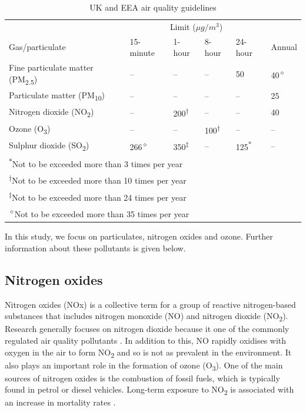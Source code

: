 \documentclass[11pt]{report}
\begin{document}
\begin{table}[!tbp]
  \centering
  \caption{UK and EEA air quality guidelines}
  \label{airqualityguidelines}
  \begin{tabular}{ l l l l l l }
  \toprule
  & \multicolumn{4}{c}{Limit ($\mu g/m^3$)} 													\\ \cmidrule(l{0mm}r{0mm}){2-6}
  Gas/particulate  							& 15-minute 	& 1-hour 	& 8-hour 	& 24-hour 	& Annual 	\\ \midrule
  Fine particulate matter (PM\textsubscript{2.5}) 	& -- 			& -- 		& -- 		& 50 		& 40\textsuperscript{$\diamond$} 		\\
  Particulate matter (PM\textsubscript{10}) 		& -- 			& -- 		& -- 		& -- 		& 25 		\\
  Nitrogen dioxide (NO\textsubscript{2}) 			& -- 			& 200\textsuperscript{$\dagger$} 	& -- 		& -- 		& 40 		\\
  Ozone (O\textsubscript{3}) 					& -- 			& -- 		& 100\textsuperscript{$\dagger$}	& --		& -- 		\\
  Sulphur dioxide (SO\textsubscript{2})			& 266\textsuperscript{$\diamond$}		& 350\textsuperscript{$\ddagger$}	& --		& 125\textsuperscript{*}	& -- 		\\ \bottomrule
  \multicolumn{6}{l}{\textsuperscript{$\ast$}\footnotesize{Not to be exceeded more than 3 times per year}} \\
  \multicolumn{6}{l}{\textsuperscript{$\dagger$}\footnotesize{Not to be exceeded more than 10 times per year}} \\
  \multicolumn{6}{l}{\textsuperscript{$\ddagger$}\footnotesize{Not to be exceeded more than 24 times per year}} \\
  \multicolumn{6}{l}{\textsuperscript{$\diamond$}\footnotesize{Not to be exceeded more than 35 times per year}} \\
  \end{tabular}
\end{table}


In this study, we focus on particulates, nitrogen oxides and ozone. Further information about these pollutants is given below.

\subsection{Nitrogen oxides}

Nitrogen oxides (NOx) is a collective term for a group of reactive nitrogen-based substances that includes nitrogen monoxide (NO) and nitrogen dioxide (NO\textsubscript{2}). Research generally focuses on nitrogen dioxide because it one of the commonly regulated air quality pollutants \citep{Brook2004cardiostmnt}. In addition to this, NO rapidly oxidises with oxygen in the air to form NO\textsubscript{2} and so is not as prevalent in the environment. It also plays an important role in the formation of ozone (O\textsubscript{3}). One of the main sources of nitrogen oxides is the combustion of fossil fuels, which is typically found in petrol or diesel vehicles. Long-term exposure to NO\textsubscript{2} is associated with an increase in mortality rates \citep{Faustini2014nitrogenmortality}.
\end{document}
